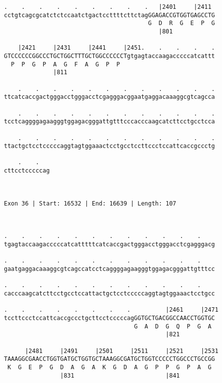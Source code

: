 \documentclass{article}
\begin{document}
\begin{Verbatim}
.    .    .    .    .    .    .    .    .   |2401     |2411 
cctgtcagcgcatctctccaatctgactccttttcttctagGGAGACCGTGGTGAGCCTG
                                         G  D  R  G  E  P  G
                                            |801            
  
    |2421     |2431     |2441     |2451.    .    .    .    .
GTCCCCCCGGCCCTGCTGGCTTTGCTGGCCCCCCTgtgagtaccaagacccccatcattt
  P  P  G  P  A  G  F  A  G  P  P                           
              |811                                          
  
    .    .    .    .    .    .    .    .    .    .    .    .
ttcatcaccgactgggacctgggacctcgagggacggaatgaggacaaaggcgtcagcca
                                                            
    .    .    .    .    .    .    .    .    .    .    .    .
tcctcaggggagaagggtggagacgggattgtttcccacccaagcatcttcctgcctcca
                                                            
    .    .    .    .    .    .    .    .    .    .    .    .
ttactgctcctcccccaggtagtggaaactcctgcctccttccctccattcaccgccctg
                                                            
    .    .   
cttcctcccccag
             
             
 
Exon 36 | Start: 16532 | End: 16639 | Length: 107



.    .    .    .    .    .    .    .    .    .    .    .    
tgagtaccaagacccccatcatttttcatcaccgactgggacctgggacctcgagggacg
                                                            
.    .    .    .    .    .    .    .    .    .    .    .    
gaatgaggacaaaggcgtcagccatcctcaggggagaagggtggagacgggattgtttcc
                                                            
.    .    .    .    .    .    .    .    .    .    .    .    
cacccaagcatcttcctgcctccattactgctcctcccccaggtagtggaaactcctgcc
                                                            
.    .    .    .    .    .    .    .          |2461     |2471
tccttccctccattcaccgccctgcttcctcccccagGGTGCTGACGGCCAACCTGGTGC
                                     G  A  D  G  Q  P  G  A 
                                              |821          
  
      |2481     |2491     |2501     |2511     |2521     |2531
TAAAGGCGAACCTGGTGATGCTGGTGCTAAAGGCGATGCTGGTCCCCCTGGCCCTGCCGG
 K  G  E  P  G  D  A  G  A  K  G  D  A  G  P  P  G  P  A  G 
                |831                          |841          
  

\end{Verbatim}
\end{document}

